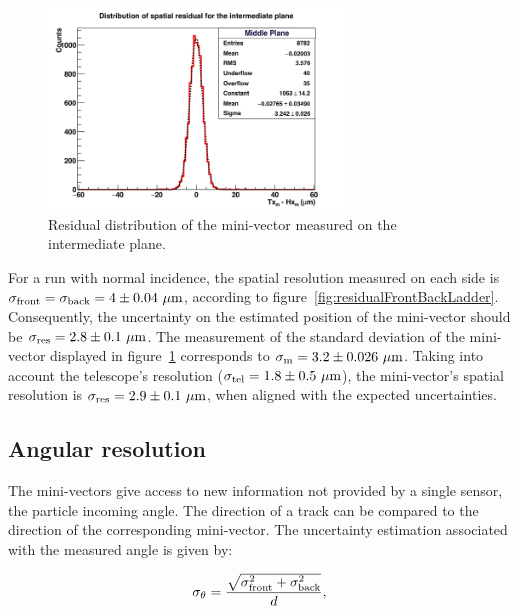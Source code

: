     \begin{figure}[!h]
      \centering
      \includegraphics[width = 0.7\textwidth]{Pictures/deformation/hDiffPosX_226056.png}
      \caption{Residual distribution of the mini-vector measured on the intermediate plane.}
      \label{fig:residualMV}
    \end{figure}

    For a run with normal incidence, the spatial resolution measured on each side is $\sigma_{\rm{front}} = \sigma_{\rm{back}} = 4 \pm 0.04~\rm{\mu m}$, according to figure~\ref{fig:residualFrontBackLadder}.
    Consequently, the uncertainty on the estimated position of the mini-vector should be $\sigma_{\rm{res}} = 2.8 \pm 0.1~\rm{\mu m}$.
    The measurement of the standard deviation of the mini-vector displayed in figure~\ref{fig:residualMV} corresponds to $\sigma_{\rm{m}} = 3.2 \pm 0.026 ~\rm{\mu m}$.
    Taking into account the telescope's resolution ($\sigma_{\rm{tel}} = 1.8 \pm 0.5~\rm{\mu m}$), the mini-vector's spatial resolution is $\sigma_{\rm{res}} = 2.9 \pm 0.1~\rm{\mu m}$, when aligned with the expected uncertainties.

   \subsection{Angular resolution}

   The mini-vectors give access to new information not provided by a single sensor, the particle incoming angle.
   The direction of a track can be compared to the direction of the corresponding mini-vector.
   The uncertainty estimation associated with the measured angle is given by:

   \begin{equation}
     \sigma_{\theta} = \frac{\sqrt{\sigma_{\rm{front}}^2 + \sigma_{\rm{back}}^2}}{d},
     \label{eq:angularResolution}
   \end{equation}

